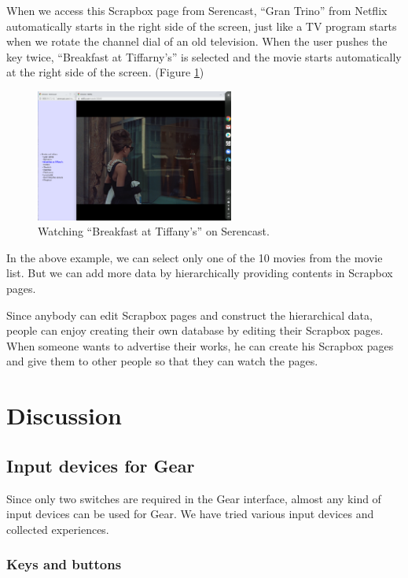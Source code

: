 \documentclass[conference]{IEEEtran}
\def\down{\tsf{▼}}
\def\SC{Serencast}
\def\SB{Scrapbox}
\begin{document}
When we access this {\SB} page from {\SC},
``Gran Trino'' from Netflix automatically starts in the right side of the screen,
just like a TV program starts when we rotate the channel dial of an old television.
When the user pushes the {\down} key twice,
``Breakfast at Tiffarny's'' is selected and
the movie starts automatically at the right side of the screen. (Figure \ref{tiffany})

\begin{figure}[H]
  \centerline{\includegraphics[width=65mm,bb=0 0 2400 1600]{figures/e8ae562a5a68a1955ac70b4faed9a146.png}}
  \caption{Watching ``Breakfast at Tiffany's'' on Serencast.}
  \label{tiffany}
\end{figure}


In the above example, we can select only one of the 10 movies from the movie list.
But we can add more data by hierarchically providing contents in {\SB} pages.

Since anybody can edit {\SB} pages and construct the hierarchical data,
people can enjoy creating their own database by editing their {\SB} pages.
When someone wants to advertise their works,
he can create his {\SB} pages
and give them to other people so that they can watch the pages.

\section{Discussion}

\subsection{Input devices for Gear}

Since only two switches are required in the Gear interface,
almost any kind of input devices can be used for Gear.
We have tried various input devices and collected experiences.

\subsubsection{Keys and buttons}
\end{document}
